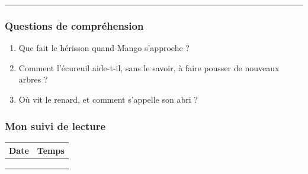 \documentclass[
  french,
  french,
  14pt,
  a4paper]{extarticle}
\providecommand{\tightlist}{%
  \setlength{\itemsep}{0pt}\setlength{\parskip}{0pt}}
\begin{document}
{\begin{center}\rule{0.5\linewidth}{0.5pt}\end{center}

\subsubsection{Questions de
compréhension}\label{questions-de-compruxe9hension-8}

\begin{enumerate}
\def\labelenumi{\arabic{enumi}.}
\tightlist
\item
  Que fait le hérisson quand Mango s'approche ?
\item
  Comment l'écureuil aide-t-il, sans le savoir, à faire pousser de
  nouveaux arbres ?
\item
  Où vit le renard, et comment s'appelle son abri ?
\end{enumerate}

\subsubsection{Mon suivi de lecture}\label{mon-suivi-de-lecture-8}

\begin{center}
\begin{tabularx}{\textwidth}{|X|X|}
\hline
\textbf{Date} & \textbf{Temps} \\
\hline
& \\
\hline
& \\
\hline
& \\
\hline
\end{tabularx}
\end{center}

}%
\newpage
\end{document}
